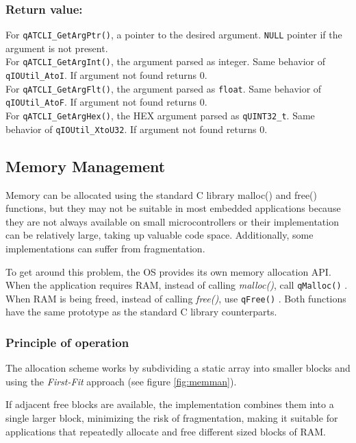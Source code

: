 \subsubsection*{Return value:}
For \lstinline{qATCLI_GetArgPtr()}, a pointer to the desired argument. \lstinline{NULL} pointer if the argument is not present. \\
For \lstinline{qATCLI_GetArgInt()}, the argument parsed as integer. Same behavior of \lstinline{qIOUtil_AtoI}. If argument not found returns 0.\\
For \lstinline{qATCLI_GetArgFlt()}, the argument parsed as \lstinline{float}. Same behavior of \lstinline{qIOUtil_AtoF}. If argument not found returns 0.\\
For \lstinline{qATCLI_GetArgHex()}, the HEX argument parsed as \lstinline{qUINT32_t}. Same behavior of \lstinline{qIOUtil_XtoU32}. If argument not found returns 0.

\subsection{Memory Management} \label{memmanagement}
Memory can be allocated using the standard C library malloc() and free() functions, but they may not be suitable in most embedded applications because they are not always available on small microcontrollers or their implementation can be relatively large, taking up valuable code space. Additionally, some implementations can suffer from fragmentation.

To get around this problem, the OS  provides its own memory allocation API. When the application requires RAM, instead of calling \textit{malloc()},  call \lstinline{qMalloc()} . When RAM is being freed, instead of calling \textit{free()}, use \lstinline{qFree()} . Both functions have the same prototype as the standard C library counterparts.

\subsubsection{Principle of operation}
The allocation scheme works by subdividing a static array into smaller blocks and using the \textit{First-Fit} approach (see figure \ref{fig:memman}). 



If adjacent free blocks are available, the implementation combines them into a single larger block, minimizing the risk of fragmentation, making it suitable for applications that repeatedly allocate and free different sized blocks of RAM. \\

